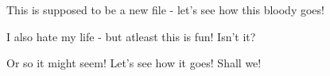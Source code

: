 This is supposed to be a new file - let's see how this bloody goes! 

I also hate my life - but atleast this is fun! Isn't it? 



Or so it might seem! Let's see how it goes! Shall we! 